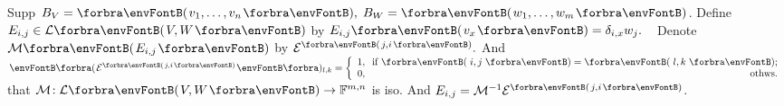 \BulletPointX\NoteFor{[3.60]}\;\;Supp $B_V=\Par{v_1,\dots,v_n},\;B_W=\Par{w_1,\dots,w_m}$.\TextB{\vspace{2pt}}
{Define $E_{i,j}\in\Lm{V,W}$ by $E_{i,j}\Par{v_x}=\delta_{i,x} w_j.$} \quad\Corollary\,\,\, \TextB{}
{\Large Denote \envFontLarge$\Mt{E_{i,j}}$ by $\mathcal{E}^{\SmallPar[1pt]{j,i}}.$} And $\BigPar{\mathcal{E}^{\SmallPar[1pt]{j,i}}}{_{l,k}}=\MathLeftBrace{l}{1,\;\;\text{if }\Par[3pt]{i,j}=\Par[3pt]{l,k};\\0,\hfill\text{othws.}}$\TextB{\vspace{4pt}}
{\NOTICE that $\mathcal{M}\!:\Lm{V,W}\rightarrow\Fbb^{m,n}$ is iso. And $E_{i,j}=\Mneg\mathcal{E}^{\SmallPar[1pt]{j,i}}$.}\TextB{\vspace{4pt}}
